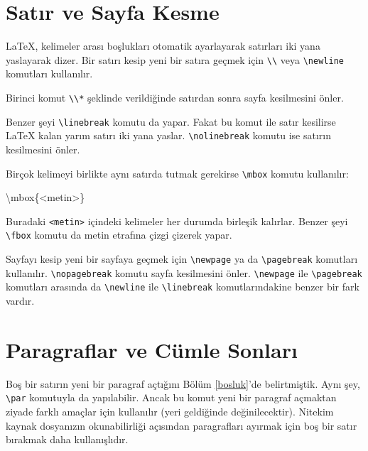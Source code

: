 \documentclass[
  10pt,
]{scrbook}
\newenvironment{Shaded}{\begin{snugshade}}{\end{snugshade}}
\newcommand{\NormalTok}[1]{#1}
\newcommand{\SpecialCharTok}[1]{\textcolor[rgb]{0.00,0.00,0.00}{#1}}
\begin{document}
\hypertarget{satux131r-ve-sayfa-kesme}{%
\section{Satır ve Sayfa Kesme}\label{satux131r-ve-sayfa-kesme}}

LaTeX, kelimeler arası boşlukları otomatik ayarlayarak satırları iki
yana yaslayarak dizer. Bir satırı kesip yeni bir satıra geçmek için \texttt{\textbackslash{}\textbackslash{}}
veya \texttt{\textbackslash{}newline} komutları kullanılır.

Birinci komut \texttt{\textbackslash{}\textbackslash{}*} şeklinde verildiğinde satırdan sonra sayfa
kesilmesini önler.

Benzer şeyi \texttt{\textbackslash{}linebreak} komutu da yapar. Fakat bu komut ile satır
kesilirse LaTeX kalan yarım satırı iki yana yaslar. \texttt{\textbackslash{}nolinebreak}
komutu ise satırın kesilmesini önler.

Birçok kelimeyi birlikte aynı satırda tutmak gerekirse \texttt{\textbackslash{}mbox} komutu
kullanılır:

\begin{Shaded}
\begin{Highlighting}[]
\NormalTok{\textbackslash{}mbox\{}\SpecialCharTok{\textless{}}\NormalTok{metin}\SpecialCharTok{\textgreater{}}\NormalTok{\}}
\end{Highlighting}
\end{Shaded}

Buradaki \texttt{\textless{}metin\textgreater{}} içindeki kelimeler her durumda birleşik kalırlar.
Benzer şeyi \texttt{\textbackslash{}fbox} komutu da metin etrafına çizgi çizerek yapar.

Sayfayı kesip yeni bir sayfaya geçmek için \texttt{\textbackslash{}newpage} ya da \texttt{\textbackslash{}pagebreak}
komutları kullanılır. \texttt{\textbackslash{}nopagebreak} komutu sayfa kesilmesini önler.
\texttt{\textbackslash{}newpage} ile \texttt{\textbackslash{}pagebreak} komutları arasında da \texttt{\textbackslash{}newline} ile
\texttt{\textbackslash{}linebreak} komutlarındakine benzer bir fark vardır.

\hypertarget{paragraflar-ve-cuxfcmle-sonlarux131}{%
\section{Paragraflar ve Cümle Sonları}\label{paragraflar-ve-cuxfcmle-sonlarux131}}

Boş bir satırın yeni bir paragraf açtığını Bölüm \ref{bosluk}'de belirtmiştik. Aynı şey, \texttt{\textbackslash{}par} komutuyla da yapılabilir.
Ancak bu komut yeni bir paragraf açmaktan ziyade farklı amaçlar için
kullanılır (yeri geldiğinde değinilecektir). Nitekim kaynak dosyanızın
okunabilirliği açısından paragrafları ayırmak için boş bir satır
bırakmak daha kullanışlıdır.
\end{document}
